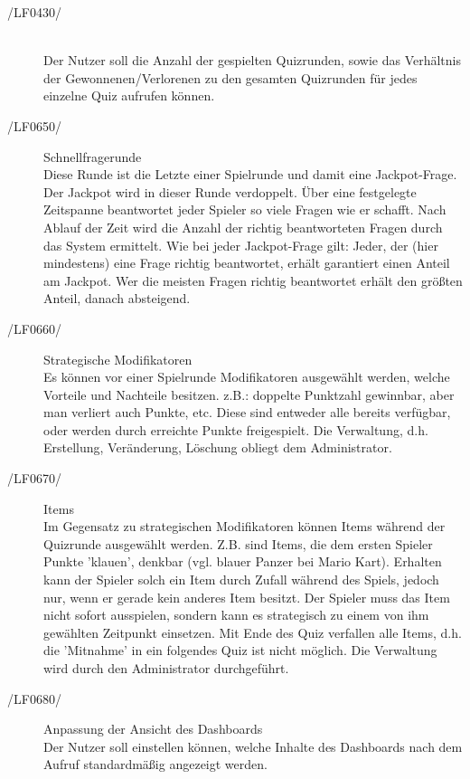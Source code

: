 \documentclass[11pt,a4paper]{scrreprt}
\begin{document}
\begin{description}
\item[/LF0430/]\ \\
Der Nutzer soll die Anzahl der gespielten Quizrunden, sowie das Verhältnis der Gewonnenen/Verlorenen zu den gesamten Quizrunden für jedes einzelne Quiz aufrufen können.

\item[/LF0650/] Schnellfragerunde \\
Diese Runde ist die Letzte einer Spielrunde und damit eine Jackpot-Frage. Der Jackpot wird in dieser Runde verdoppelt.
Über eine festgelegte Zeitspanne beantwortet jeder Spieler so viele Fragen wie er schafft. Nach Ablauf der Zeit wird die Anzahl der richtig beantworteten Fragen durch das System ermittelt.
Wie bei jeder Jackpot-Frage gilt: Jeder, der (hier mindestens) eine Frage richtig beantwortet, erhält garantiert einen Anteil am Jackpot. Wer die meisten Fragen richtig beantwortet erhält den größten Anteil, danach absteigend.

\item[/LF0660/] Strategische Modifikatoren \\
Es können vor einer Spielrunde Modifikatoren ausgewählt werden, welche Vorteile und Nachteile besitzen. z.B.: doppelte Punktzahl gewinnbar, aber man verliert auch Punkte, etc.
Diese sind entweder alle bereits verfügbar, oder werden durch erreichte Punkte freigespielt. Die Verwaltung, d.h. Erstellung, Veränderung, Löschung obliegt dem Administrator.

\item[/LF0670/] Items \\
Im Gegensatz zu strategischen Modifikatoren können Items während der Quizrunde ausgewählt werden. Z.B. sind Items, die dem ersten Spieler Punkte 'klauen', denkbar (vgl. blauer Panzer bei Mario Kart). Erhalten kann der Spieler solch ein Item durch Zufall während des Spiels, jedoch nur, wenn er gerade kein anderes Item besitzt. Der Spieler muss das Item nicht sofort ausspielen, sondern kann es strategisch zu einem von ihm gewählten Zeitpunkt einsetzen. Mit Ende des Quiz verfallen alle Items, d.h. die 'Mitnahme' in ein folgendes Quiz ist nicht möglich. Die Verwaltung wird durch den Administrator durchgeführt.
\end{description}

\begin{description}
\item[/LF0680/] Anpassung der Ansicht des Dashboards \\
Der Nutzer soll einstellen können, welche Inhalte des Dashboards nach dem Aufruf standardmäßig angezeigt werden.

\end{description}
\end{document}
